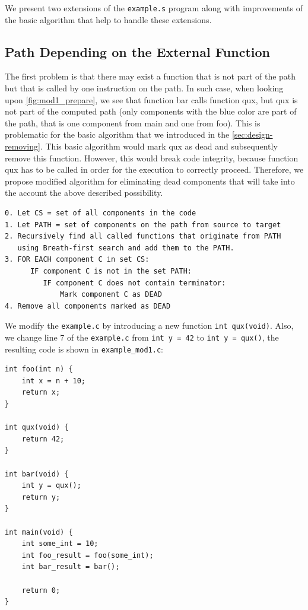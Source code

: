 \documentclass[12pt, twoside]{fithesis2}
\renewcommand{\_}{\leavevmode \kern0.07em\vbox{\hrule width0.4em}}
\begin{document}
We present two extensions of the \texttt{example.s} program along with
improvements of the basic algorithm that help to handle these extensions.

\clearpage

\subsection{Path Depending on the External Function}
\label{subsec:path_function}

The first problem is that there may exist a function that is not part of the
path but that is called by one instruction on the path.
In such case, when looking upon \autoref{fig:mod1_prepare}, we see that
function bar calls function qux, but qux is not part of the computed path (only
components with the blue color are part of the path, that is one component from
main and one from foo).
This is problematic for the basic algorithm that we introduced in the
\autoref{sec:design-removing}.
This basic algorithm would mark qux as dead and subsequently remove this
function. However, this would break code integrity, because function qux has to
be called in order for the execution to correctly proceed.
Therefore, we propose modified algorithm for eliminating dead components that
will take into the account the above described possibility.

\begin{verbatim}
0. Let CS = set of all components in the code
1. Let PATH = set of components on the path from source to target
2. Recursively find all called functions that originate from PATH
   using Breath-first search and add them to the PATH.
3. FOR EACH component C in set CS:
      IF component C is not in the set PATH:
         IF component C does not contain terminator:
             Mark component C as DEAD
4. Remove all components marked as DEAD
\end{verbatim}


We modify the \texttt{example.c} by introducing a new function
\texttt{int qux(void)}. Also, we change line 7 of the
\texttt{example.c} from
\texttt{int y = 42} to \texttt{int y = qux()}, the resulting code
is shown in \texttt{example_mod1.c}:

\begin{verbatim}
int foo(int n) {
    int x = n + 10;
    return x;
}

int qux(void) {
    return 42;
}

int bar(void) {
    int y = qux();
    return y;
}

int main(void) {
    int some_int = 10;
    int foo_result = foo(some_int);
    int bar_result = bar();

    return 0;
}
\end{verbatim}
\end{document}
